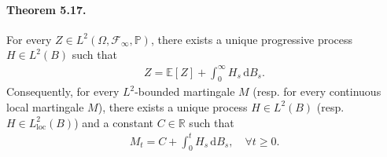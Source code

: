 \documentclass{article}
\numberwithin{equation}{section}
\newcommand{\E}{\mathbb{E}}
\renewcommand{\P}{\mathbb{P}}
\renewcommand{\d}{\mathrm{d}}
\theoremstyle{plain}
\theoremstyle{definition}
\begin{document}
\paragraph{Theorem 5.17.\label{thm:5.17}} For every $Z\in L^2(\Omega,\mathscr{F}_\infty,\P)$, there exists a unique progressive process $H\in L^2(B)$ such that
\begin{align*}
	Z=\E[Z]+\int_0^\infty H_s\,\d B_s.\tag{5.12}\label{eq:5.12}
\end{align*}
Consequently, for every $L^2$-bounded martingale $M$ (resp. for every continuous local martingale $M$), there exists a unique process $H\in L^2(B)$ (resp. $H\in L^2_{\mathrm{loc}}(B)$) and a constant $C\in\mathbb{R}$ such that
\begin{align*}
	M_t = C+\int_0^t H_s\,\d B_s,\quad \forall t\geq 0.\label{eq:5.13}\tag{5.13}
\end{align*}
\end{document}
